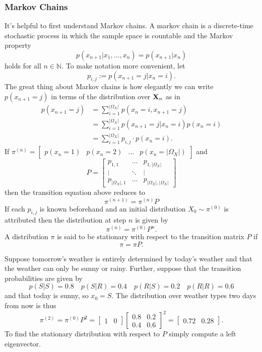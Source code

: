 \documentclass[11pt]{article}
\begin{document}
\begin{appendices}
\subsubsection{Markov Chains}
It's helpful to first understand Markov chains. A markov chain is a discrete-time stochastic process in which the sample space is countable and the Markov property
$$
p(x_{n+1}|x_1,\dots,x_n)
=
p(x_{n+1}|x_n)
$$
holds for all $n\in\mathbb{N}$. To make notation more convenient, let
$$
p_{i,j}
:=
p(x_{n+1}=j|x_n=i).
$$
The great thing about Markov chains is how elegantly we can write $p(x_{n+1}=j)$ in terms of the distribution over $\mathbf{X}_n$ as in
\begin{align*}
    p(x_{n+1}=j)
    &=
    \sum_{i=1}^{|\Omega_X|} p(x_n=i,x_{n+1}=j)\\
    &=
    \sum_{i=1}^{|\Omega_X|} p(x_{n+1}=j|x_n=i)p(x_n=i)\\
    &=
    \sum_{i=1}^{|\Omega_X|} p_{i,j}\cdot p(x_n=i).
\end{align*}
If $\pi^{(n)}=\begin{bmatrix} p(x_n=1) & p(x_n=2) & \dots & p(x_n=|\Omega_X|)\end{bmatrix}$ and
$$
P
=
\begin{bmatrix}
    p_{1,1}          & \dots  & p_{1,|\Omega_X|}\\
    \vdots           & \ddots & \vdots          \\
    p_{|\Omega_X|,1} & \dots  & p_{|\Omega_X|, |\Omega_X|}
\end{bmatrix}
$$
then the transition equation above reduces to
$$
\pi^{(n+1)}
=
\pi^{(n)}P
$$
If each $p_{i,j}$ is known beforehand and an initial distribution $X_0\sim\pi^{(0)}$ is attributed then the distribution at step $n$ is given by
$$
\pi^{(n)}
=
\pi^{(0)}P^n.
$$
A distribution $\pi$ is said to be stationary with respect to the transition matrix $P$ if
$$
\pi
=
\pi P.
$$

\begin{example}
    Suppose tomorrow's weather is entirely determined by today's weather and that the weather can only be sunny or rainy. Further, suppose that the transition probabilities are given by
    $$
    p(S|S)=0.8\quad
    p(S|R)=0.4\quad
    p(R|S)=0.2\quad
    p(R|R)=0.6
    $$
    and that today is sunny, so $x_0=S$. The distribution over weather types two days from now is thus
    $$
    \pi^{(2)}
    =
    \pi^{(0)}P^2
    =
    \begin{bmatrix}1&0\end{bmatrix}
    \begin{bmatrix}
        0.8 & 0.2\\
        0.4 & 0.6
    \end{bmatrix}^2
    =
    \begin{bmatrix}0.72&0.28\end{bmatrix}.
    $$
    To find the stationary distribution with respect to $P$ simply compute a left eigenvector.
\end{example}


\end{appendices}
\end{document}
